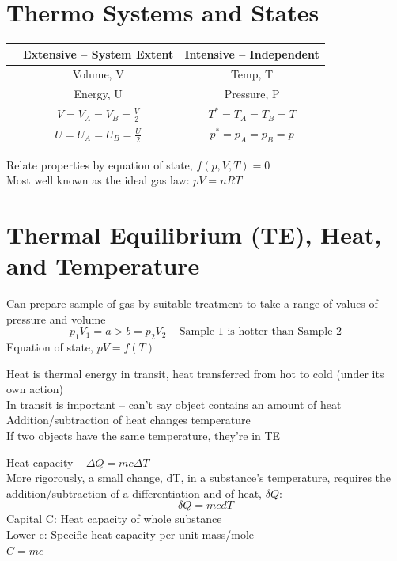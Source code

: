 \documentclass[a4paper, 11pt, normalem]{report}
\newcommand\answerbox{%
    \fbox{\rule{0.8in}{0pt}\rule[-0.5ex]{0pt}{3ex}}}
\newcommand\halfbox{%
    \fbox{\rule{0.36in}{0pt}\rule[-0.25ex]{0pt}{3ex}}}
\begin{document}
\section{Thermo Systems and States}
\begin{table}[H]
    \centering
    \begin{tabular}{c|c|c}
         & Extensive -- System Extent & Intensive -- Independent \\
         \hline
         \multirow{2}{7em}{\answerbox} & Volume, V & Temp, T \\
         & Energy, U & Pressure, P \\
         \hline
         \multirow{2}{7em}{\halfbox \halfbox} & $V = V_A = V_B = \frac{V}{2}$ & $T^* = T_A = T_B = T$ \\
         & $U = U_A = U_B = \frac{U}{2}$ & $p^* = p_A = p_B = p$
    \end{tabular}
\end{table}
Relate properties by equation of state, $f(p,V,T) = 0$ \\
Most well known as the ideal gas law: $pV = nRT$

\section{Thermal Equilibrium (TE), Heat, and Temperature}
Can prepare sample of gas by suitable treatment to take a range of values of pressure and volume
\begin{equation*}
    p_{1}V_{1} = a > b = p_{2}V_{2} \text{ -- Sample 1 is hotter than Sample 2}
\end{equation*}
Equation of state, $pV = f(T)$

Heat is thermal energy in transit, heat transferred from hot to cold (under its own action) \\
In transit is important -- can't say object contains an amount of heat \\
Addition/subtraction of heat changes temperature \\
If two objects have the same temperature, they're in TE

Heat capacity -- $\Delta Q = mc\Delta T$ \\
More rigorously, a small change, dT, in a substance's temperature, requires the addition/subtraction of a differentiation and of heat,  $\delta Q$:
\begin{equation*}
    \delta Q = mcdT
\end{equation*}
Capital C: Heat capacity of whole substance \\
Lower c: Specific heat capacity per unit mass/mole \\
$C = mc$
\end{document}
